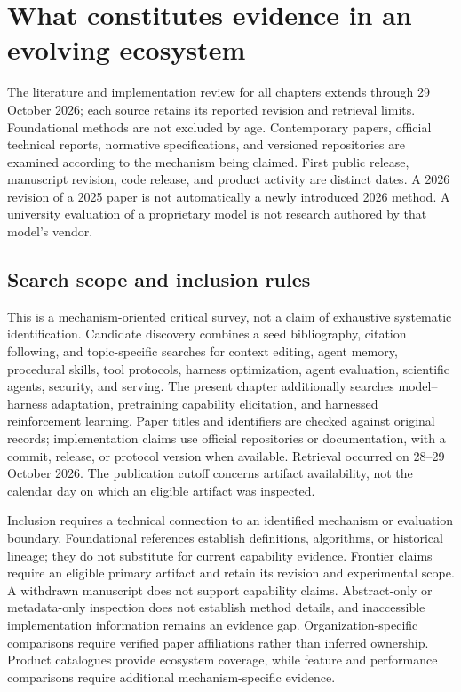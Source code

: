 \section{What constitutes evidence in an evolving ecosystem}
\label{sec:C01:evidence}
The literature and implementation review for all chapters extends through 29 October 2026; each source retains its reported revision and retrieval limits. Foundational methods are not excluded by age. Contemporary papers, official technical reports, normative specifications, and versioned repositories are examined according to the mechanism being claimed. First public release, manuscript revision, code release, and product activity are distinct dates. A 2026 revision of a 2025 paper is not automatically a newly introduced 2026 method. A university evaluation of a proprietary model is not research authored by that model's vendor.

\subsection{Search scope and inclusion rules}\label{sec:C01:search}
This is a mechanism-oriented critical survey, not a claim of exhaustive systematic identification. Candidate discovery combines a seed bibliography, citation following, and topic-specific searches for context editing, agent memory, procedural skills, tool protocols, harness optimization, agent evaluation, scientific agents, security, and serving. The present chapter additionally searches model--harness adaptation, pretraining capability elicitation, and harnessed reinforcement learning. Paper titles and identifiers are checked against original records; implementation claims use official repositories or documentation, with a commit, release, or protocol version when available. Retrieval occurred on 28--29 October 2026. The publication cutoff concerns artifact availability, not the calendar day on which an eligible artifact was inspected.

Inclusion requires a technical connection to an identified mechanism or evaluation boundary. Foundational references establish definitions, algorithms, or historical lineage; they do not substitute for current capability evidence. Frontier claims require an eligible primary artifact and retain its revision and experimental scope. A withdrawn manuscript does not support capability claims. Abstract-only or metadata-only inspection does not establish method details, and inaccessible implementation information remains an evidence gap. Organization-specific comparisons require verified paper affiliations rather than inferred ownership. Product catalogues provide ecosystem coverage, while feature and performance comparisons require additional mechanism-specific evidence.

